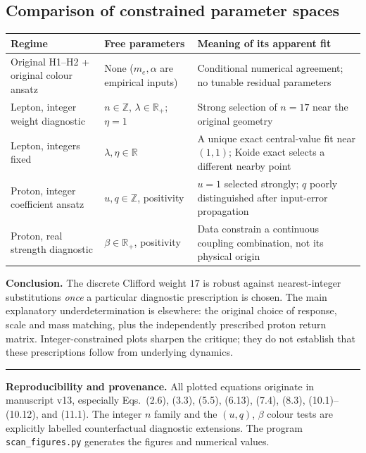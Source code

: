 \documentclass[10.5pt,a4paper]{article}
\begin{document}
\subsection*{Comparison of constrained parameter spaces}
\begin{center}\small
\begin{tabular}{@{}p{32mm}p{45mm}p{66mm}@{}}\toprule
Regime & Free parameters & Meaning of its apparent fit\\\midrule
Original H1--H2 + original colour ansatz & None (\(m_e,\alpha\) are empirical inputs) & Conditional numerical agreement; no tunable residual parameters\\
Lepton, integer weight diagnostic & \(n\in\mathbb Z\), \(\lambda\in\mathbb R_+\); \(\eta=1\) & Strong selection of \(n=17\) near the original geometry\\
Lepton, integers fixed & \(\lambda,\eta\in\mathbb R\) & A unique exact central-value fit near \((1,1)\); Koide exact selects a different nearby point\\
Proton, integer coefficient ansatz & \(u,q\in\mathbb Z\), positivity & \(u=1\) selected strongly; \(q\) poorly distinguished after input-error propagation\\
Proton, real strength diagnostic & \(\beta\in\mathbb R_+\), positivity & Data constrain a continuous coupling combination, not its physical origin\\\bottomrule
\end{tabular}
\end{center}
\textbf{Conclusion.} The discrete Clifford weight \(17\) is robust against nearest-integer substitutions \emph{once} a particular diagnostic prescription is chosen. The main explanatory underdetermination is elsewhere: the original choice of response, scale and mass matching, plus the independently prescribed proton return matrix. Integer-constrained plots sharpen the critique; they do not establish that these prescriptions follow from underlying dynamics.

\vspace{4pt}\hrule\vspace{5pt}
{\footnotesize\color{muted}\textbf{Reproducibility and provenance.} All plotted equations originate in manuscript v13, especially Eqs.~(2.6), (3.3), (5.5), (6.13), (7.4), (8.3), (10.1)--(10.12), and (11.1). The integer \(n\) family and the \((u,q)\), \(\beta\) colour tests are explicitly labelled counterfactual diagnostic extensions. The program \texttt{scan\_figures.py} generates the figures and numerical values.}
\end{document}
